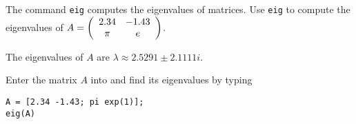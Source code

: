 \documentclass{ximera}
\begin{document}
\begin{exercise} \label{c7.8.7}
The \Matlab command {\tt eig} computes the eigenvalues
of matrices.  Use {\tt eig} to compute the eigenvalues of 
$A = \left(\begin{array}{cc} 2.34 & -1.43\\ \pi &e\end{array}\right)$.

\begin{solution}
\ans The eigenvalues of $A$ are $\lambda \approx 2.5291 \pm
2.1111i$.

\soln Enter the matrix $A$ into \Matlab and find its eigenvalues by typing
\begin{verbatim}
A = [2.34 -1.43; pi exp(1)];
eig(A)
\end{verbatim}











\end{solution}
\end{exercise}
\end{document}

